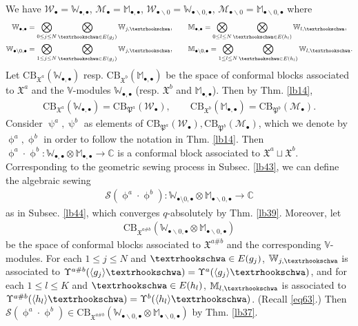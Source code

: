 \documentclass[11pt,b5paper,notitlepage]{article}
\theoremstyle{definition}
\theoremstyle{plain}
\newcommand{\fk}{\mathfrak}
\newcommand{\mc}{\mathcal}
\newcommand{\bk}[1]{\langle {#1}\rangle}
\newcommand{\scr}{\mathscr}
\newcommand{\blt}{\bullet}
\newcommand{\Vbb}{\mathbb V}
\newcommand{\Wbb}{\mathbb W}
\newcommand{\Mbb}{\mathbb M}
\newcommand{\Cbb}{\mathbb C}
\newcommand{\CB}{\mathrm{CB}}
\newcommand{\tipae}{\text{\textrhookschwa}}
\numberwithin{equation}{subsection}
\begin{document}
We have $\mc W_\blt=\Wbb_{\blt,\blt}$, $\mc M_\blt=\Mbb_{\blt,\blt}$, $\mc W_{\blt\backslash0}=\Wbb_{\blt\backslash0,\blt}$, $\mc M_{\blt\backslash0}=\Mbb_{\blt\backslash0,\blt}$ where
\begin{gather*}
\Wbb_{\blt,\blt}=\bigotimes_{0\leq j\leq N}\bigotimes_{\tipae\in E(g_j)}\Wbb_{j,\tipae},\qquad 	\Mbb_{\blt,\blt}=\bigotimes_{0\leq l\leq N}\bigotimes_{\tipae\in E(h_l)}\Wbb_{l,\tipae},\\
\Wbb_{\blt\backslash0,\blt}=\bigotimes_{1\leq j\leq N}\bigotimes_{\tipae\in E(g_j)}\Wbb_{j,\tipae},\qquad 	\Mbb_{\blt\backslash0,\blt}=\bigotimes_{1\leq l\leq N}\bigotimes_{\tipae\in E(h_l)}\Wbb_{l,\tipae}.
\end{gather*}
Let $\CB_{\fk X^a}(\Wbb_{\blt,\blt})$ resp. $\CB_{\fk X^b}(\Mbb_{\blt,\blt})$ be the space of conformal blocks associated to $\fk X^a$ and the $\Vbb$-modules $\Wbb_{\blt,\blt}$ (resp. $\fk X^b$ and $\Mbb_{\blt,\blt}$). Then by Thm. \ref{lb14},
\begin{gather*}
\CB_{\fk X^a}(\Wbb_{\blt,\blt})=\CB_{\fk P^a}(\mc W_\blt),\qquad \CB_{\fk X^b}(\Mbb_{\blt,\blt})=\CB_{\fk P^b}(\mc M_\blt).	
\end{gather*}
Consider $\uppsi^a,\uppsi^b$ as elements of $\CB_{\fk P^a}(\mc W_\blt),\CB_{\fk P^b}(\mc M_\blt)$, which we denote by $\upphi^a,\upphi^b$ in order to follow the notation in Thm. \ref{lb14}. Then $\upphi^a\cdot\upphi^b:\Wbb_{\blt,\blt}\otimes\Mbb_{\blt,\blt}\rightarrow\Cbb$ is a conformal block associated to $\fk X^a\sqcup\fk X^b$. Corresponding to the geometric sewing process in Subsec. \ref{lb43}, we can define the algebraic sewing
\begin{align*}
\scr S(\upphi^a\cdot \upphi^b):\Wbb_{\blt\setminus0,\blt}\otimes\Mbb_{\blt\backslash0,\blt}\rightarrow\Cbb	
\end{align*}
as in Subsec. \ref{lb44}, which converges $q$-absolutely by Thm. \ref{lb39}. Moreover, let
\begin{align*}
\CB_{\fk X^{a\#b}}(\Wbb_{\blt\backslash0,\blt}\otimes\Mbb_{\blt\backslash0,\blt})	
\end{align*}
be the space of conformal blocks associated to $\fk X^{a\#b}$ and the corresponding $\Vbb$-modules. For each $1\leq j\leq N$ and $\tipae\in E(g_j)$,   $\Wbb_{j,\tipae}$ is associated to $\Upsilon^{a\#b}(\bk{g_j}\tipae)=\Upsilon^a(\bk{g_j}\tipae)$, and for each $1\leq l\leq K$ and $\tipae\in E(h_l)$, $\Mbb_{l,\tipae}$ is associated to $\Upsilon^{a\#b}(\bk{h_l}\tipae)=\Upsilon^b(\bk{h_l}\tipae)$. (Recall \eqref{eq63}.) Then $\scr S(\upphi^a\cdot \upphi^b)\in\CB_{\fk X^{a\#b}}(\Wbb_{\blt\backslash0,\blt}\otimes\Mbb_{\blt\backslash0,\blt})$ by Thm. \ref{lb37}.
\end{document}

